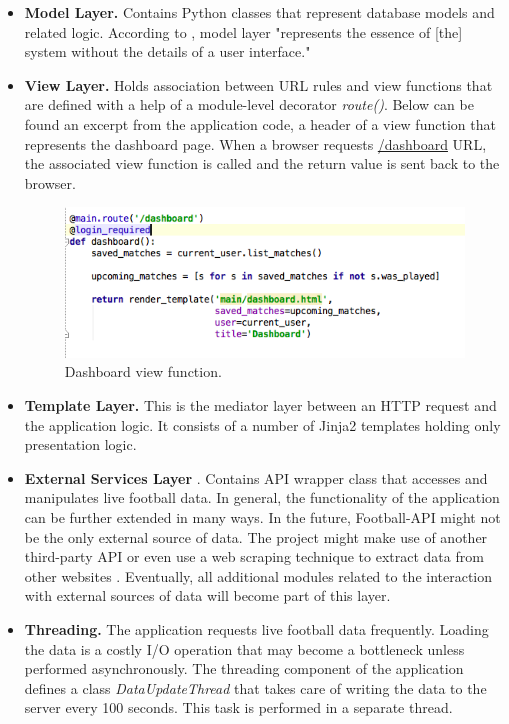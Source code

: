 \begin{itemize}
   \item \textbf{Model Layer.} Contains Python classes that represent database models and related logic. According to \citet{article:goodArchitecture}, model layer "represents the essence of [the] system without the details of a user interface."
   \item \textbf{View Layer.} Holds association between URL rules and view functions that are defined with a help of a module-level decorator \emph{route()}. Below can be found an excerpt from the application code, a header of a view function that represents the dashboard page. When a browser requests \url{/dashboard} URL, the associated view function is called and the return value is sent back to the browser.

\begin{figure}[H]
   \begin{center}
       \includegraphics[width=.70\textwidth]{impl/images/routeExample}
       \caption{Dashboard view function.} \label{fig:using:routeexample}
   \end{center}
\end{figure}    
      
   \item \textbf{Template Layer.} This is the mediator layer between an HTTP request and the application logic. It consists of a number of Jinja2 templates holding only presentation logic.
   \item \textbf{External Services Layer} \citep{article:goodArchitecture}. Contains API wrapper class that accesses and manipulates live football data. In general, the functionality of the application can be further extended in many ways. In the future, Football-API might not be the only external source of data. The project might make use of another third-party API or even use a web scraping technique to extract data from other websites . Eventually, all additional modules related to the interaction with external sources of data will become part of this layer.
   \item \textbf{Threading.} The application requests live football data frequently. Loading the data is a costly I/O operation that may become a bottleneck unless performed asynchronously. The threading component of the application defines a class \emph{DataUpdateThread} that takes care of writing the data to the server every 100 seconds. This task is performed in a separate thread.
\end{itemize}

